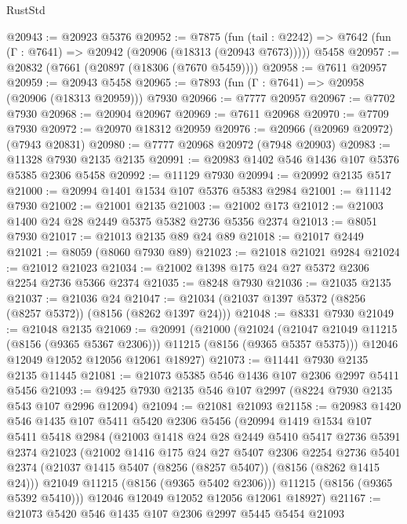 \begin{lexlean}{RustStd}
\begin{coremodule}
{\begin{coremodule}
{{{{{{{{{{{{{{{{{{{{{{{{{{{{{{{{{{@20943 := @20923 @5376
@20952 := @7875
    (fun (tail : @2242) => @7642 (fun (Γ : @7641) => @20942 (@20906 (@18313 (@20943 @7673)))))
    @5458
@20957 := @20832 (@7661 (@20897 (@18306 (@7670 @5459))))
@20958 := @7611 @20957
@20959 := @20943 @5458
@20965 := @7893 (fun (Γ : @7641) => @20958 (@20906 (@18313 @20959))) @7930
@20966 := @7777 @20957
@20967 := @7702 @7930
@20968 := @20904 @20967
@20969 := @7611 @20968
@20970 := @7709 @7930
@20972 := @20970 @18312 @20959
@20976 := @20966 (@20969 @20972) (@7943 @20831)
@20980 := @7777 @20968 @20972 (@7948 @20903)
@20983 := @11328 @7930 @2135 @2135
@20991 := @20983 @1402 @546 @1436 @107 @5376 @5385 @2306 @5458
@20992 := @11129 @7930
@20994 := @20992 @2135 @517
@21000 := @20994 @1401 @1534 @107 @5376 @5383 @2984
@21001 := @11142 @7930
@21002 := @21001 @2135
@21003 := @21002 @173
@21012 := @21003 @1400 @24 @28 @2449 @5375 @5382 @2736 @5356 @2374
@21013 := @8051 @7930
@21017 := @21013 @2135 @89 @24 @89
@21018 := @21017 @2449
@21021 := @8059 (@8060 @7930 @89)
@21023 := @21018 @21021 @9284
@21024 := @21012 @21023
@21034 := @21002 @1398 @175 @24 @27 @5372 @2306 @2254 @2736 @5366 @2374
@21035 := @8248 @7930
@21036 := @21035 @2135
@21037 := @21036 @24
@21047 := @21034 (@21037 @1397 @5372 (@8256 (@8257 @5372)) (@8156 (@8262 @1397 @24)))
@21048 := @8331 @7930
@21049 := @21048 @2135
@21069 := @20991
    (@21000
      (@21024 (@21047 @21049 @11215 (@8156 (@9365 @5367 @2306))) @11215 (@8156 (@9365 @5357 @5375)))
      @12046
      @12049
      @12052
      @12056
      @12061
      @18927)
@21073 := @11441 @7930 @2135 @2135 @11445
@21081 := @21073 @5385 @546 @1436 @107 @2306 @2997 @5411 @5456
@21093 := @9425 @7930 @2135 @546 @107 @2997 (@8224 @7930 @2135 @543 @107 @2996 @12094)
@21094 := @21081 @21093
@21158 := @20983
    @1420
    @546
    @1435
    @107
    @5411
    @5420
    @2306
    @5456
    (@20994
      @1419
      @1534
      @107
      @5411
      @5418
      @2984
      (@21003
        @1418
        @24
        @28
        @2449
        @5410
        @5417
        @2736
        @5391
        @2374
        @21023
        (@21002
          @1416
          @175
          @24
          @27
          @5407
          @2306
          @2254
          @2736
          @5401
          @2374
          (@21037 @1415 @5407 (@8256 (@8257 @5407)) (@8156 (@8262 @1415 @24)))
          @21049
          @11215
          (@8156 (@9365 @5402 @2306)))
        @11215
        (@8156 (@9365 @5392 @5410)))
      @12046
      @12049
      @12052
      @12056
      @12061
      @18927)
@21167 := @21073 @5420 @546 @1435 @107 @2306 @2997 @5445 @5454 @21093
}}}}}}}}}}}}}}}}}}}}}}}}}}}}}}}}}}
\end{coremodule}}
\end{coremodule}
\end{lexlean}
